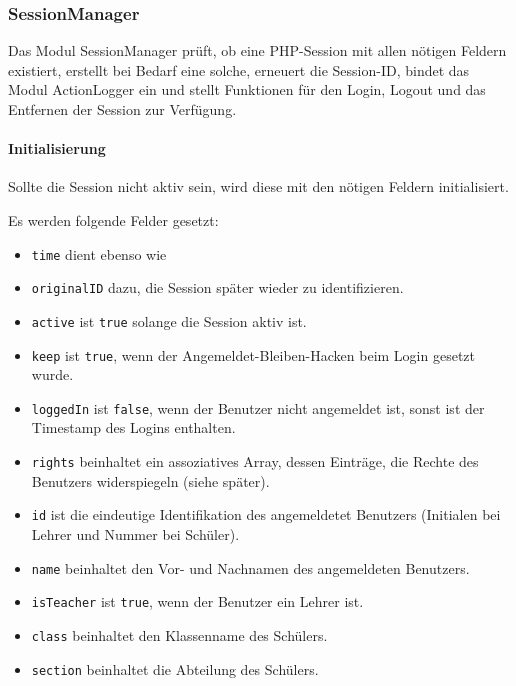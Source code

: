 \subsubsection{SessionManager}
\label{sec:content_imple_base_session}
Das Modul SessionManager prüft, ob eine PHP-Session mit allen nötigen Feldern existiert, erstellt bei Bedarf eine solche, erneuert die Session-ID, bindet das Modul ActionLogger ein und stellt Funktionen für den Login, Logout und das Entfernen der Session zur Verfügung.\\
\paragraph{Initialisierung\\}
Sollte die Session nicht aktiv sein, wird diese mit den nötigen Feldern initialisiert.

Es werden folgende Felder gesetzt:
\begin{itemize}
	\item \texttt{time} dient ebenso wie
	\item \texttt{originalID} dazu, die Session später wieder zu identifizieren.
	\item \texttt{active} ist \texttt{true} solange die Session aktiv ist.
	\item \texttt{keep} ist \texttt{true}, wenn der Angemeldet-Bleiben-Hacken beim Login gesetzt wurde.
	\item \texttt{loggedIn} ist \texttt{false}, wenn der Benutzer nicht angemeldet ist, sonst ist der Timestamp des Logins enthalten.
	\item \texttt{rights} beinhaltet ein assoziatives Array, dessen Einträge, die Rechte des Benutzers widerspiegeln (siehe später).
	\item \texttt{id} ist die eindeutige Identifikation des angemeldetet Benutzers (Initialen bei Lehrer und Nummer bei Schüler).
	\item \texttt{name} beinhaltet den Vor- und Nachnamen des angemeldeten Benutzers.
	\item \texttt{isTeacher} ist \texttt{true}, wenn der Benutzer ein Lehrer ist.
	\item \texttt{class} beinhaltet den Klassenname des Schülers.
	\item \texttt{section} beinhaltet die Abteilung des Schülers.
\end{itemize}

